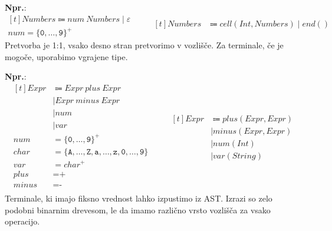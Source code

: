 \documentclass{report}
\newcommand{\Ex}{\textbf{Npr.}:\ }
\newcommand{\Null}{\varepsilon}
\newcommand{\Char}[1]{\texttt{#1}}
\newcommand{\Spc}{\ }
\newcommand{\Union}{\mathrel{|}}
\newcommand{\KleenePlus}[1]{#1^+}
\newcommand{\Arrow}{\Coloneq}
\newcommand{\NT}[1]{{#1}}
\newcommand{\T}[1]{{#1}}
\begin{document}
\Ex
\begin{equation*}
  \begin{aligned}[t]
    \NT{Numbers} \Arrow \T{num} \Spc \NT{Numbers} \Union \Null\\[1em]
    \T{num} = \KleenePlus{\{\Char{0}, \dots, \Char{9}\}}
  \end{aligned}
  \qquad
  \begin{aligned}[t]
    Numbers &\Arrow cell(Int, Numbers) \Union end()\\
  \end{aligned}
\end{equation*}
Pretvorba je 1:1, vsako desno stran pretvorimo v vozlišče.
Za terminale, če je mogoče, uporabimo vgrajene tipe.

\Ex
\begin{equation*}
  \begin{aligned}[t]
    \NT{Expr} &\Arrow \NT{Expr} \Spc \T{plus} \Spc \NT{Expr} \\
    &\Union \NT{Expr} \Spc \T{minus} \Spc \NT{Expr} \\
    &\Union \T{num}\\
    &\Union \T{var}\\[1em]
    \T{num} &= \KleenePlus{\{\Char{0}, \dots, \Char{9}\}}\\
    \T{char} &= \{\Char{A}, \dots, \Char{Z}, \Char{a}, \dots, \Char{z}, \Char{0}, \dots, \Char{9} \}\\
    \T{var} &= \KleenePlus{\T{char}}\\
    \T{plus} &= \Char{+}\\
    \T{minus} &= \Char{-}\\
  \end{aligned}
  \qquad
  \begin{aligned}[t]
    Expr &\Arrow plus(Expr, Expr) \\
    &\Union minus(Expr, Expr) \\
    &\Union num(Int)\\
    &\Union var(String)
  \end{aligned}
\end{equation*}
Terminale, ki imajo fiksno vrednost lahko izpustimo iz AST.
Izrazi so zelo podobni binarnim drevesom, le da imamo različno vrsto vozlišča za vsako operacijo.
\end{document}
